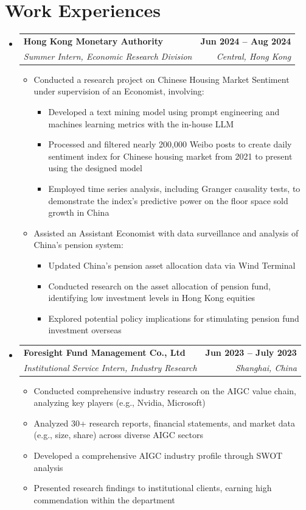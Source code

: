 \documentclass[letterpaper,11pt]{article}
\makeatletter
\newcommand{\resumeItem}[1]{
  \item\small{
    {#1 \vspace{-2pt}}
  }
}
\newcommand{\resumeSubheading}[4]{
  \vspace{-2pt}\item
    \begin{tabular*}{1.0\textwidth}[t]{l@{\extracolsep{\fill}}r}
      \textbf{#1} & \textbf{\small #2} \\
      \textit{\small#3} & \textit{\small #4} \\
    \end{tabular*}\vspace{-7pt}
}
\newcommand{\resumeSubHeadingListStart}{\begin{itemize}[leftmargin=0.0in, label={}]}
\newcommand{\resumeSubHeadingListEnd}{\end{itemize}}
\newcommand{\resumeItemListStart}{\begin{itemize}}
\newcommand{\resumeItemListEnd}{\end{itemize}\vspace{-5pt}}
\makeatother
\begin{document}
\section{Work Experiences}
    \resumeSubHeadingListStart
        \resumeSubheading
            {Hong Kong Monetary Authority}{Jun 2024 -- Aug 2024}
            {Summer Intern, Economic Research Division}{Central, Hong Kong}
            \resumeItemListStart
                \resumeItem{Conducted a research project on Chinese Housing Market Sentiment under supervision of an Economist, involving:}
                \begin{itemize}[label=$\circ$]
                    \item Developed a text mining model using prompt engineering and machines learning metrics with the in-house LLM
                    \item Processed and filtered nearly 200,000 Weibo posts to create daily sentiment index for Chinese housing market from 2021 to present using the designed model
                    \item Employed time series analysis, including Granger causality tests, to demonstrate the index’s predictive power on the floor space sold growth in China 
                \end{itemize}
                \resumeItem{Assisted an Assistant Economist with data surveillance and analysis of China’s pension system:}
                \begin{itemize}[label=$\circ$]
                    \item Updated China's pension asset allocation data via Wind Terminal
                    \item Conducted research on the asset allocation of pension fund, identifying low investment levels in Hong Kong equities
                    \item Explored potential policy implications for stimulating pension fund investment overseas
                \end{itemize}
            \resumeItemListEnd
        \resumeSubheading
            {Foresight Fund Management Co., Ltd}{Jun 2023 -- July 2023}
            {Institutional Service Intern, Industry Research}{Shanghai, China}
            \resumeItemListStart
                \resumeItem{Conducted comprehensive industry research on the AIGC value chain, analyzing key players (e.g., Nvidia, Microsoft)}
                \resumeItem{Analyzed 30+ research reports, financial statements, and market data (e.g., size, share) across diverse AIGC sectors}
                \resumeItem{Developed a comprehensive AIGC industry profile through SWOT analysis}
                \resumeItem{Presented research findings to institutional clients, earning high commendation within the department}
            \resumeItemListEnd
    \resumeSubHeadingListEnd
\vspace{-16pt}
\end{document}

